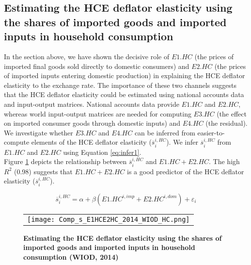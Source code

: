 \documentclass[11pt,a4paper]{paper} %
\begin{document}
\subsection{Estimating the HCE deflator elasticity using the shares of imported goods and imported inputs in household consumption}
\label{subsec:estimatingHCEwithnationalaccounts}
In the section above, we have shown the decisive role of $E1.HC$ (the prices of imported final goods sold directly to domestic consumers) and $E2.HC$ (the prices of imported inputs entering domestic production) in explaining the HCE deflator elasticity to the exchange rate.
The importance of these two channels suggests that the HCE deflator elasticity could be estimated using national accounts data and input-output matrices. 
National accounts data provide $E1.HC$ and $E2.HC$, whereas world input-output matrices are needed for computing $E3.HC$ (the effect on imported
consumer goods through domestic inputs) and $E4.HC$ (the residual). 
We investigate whether $E3.HC$ and $E4.HC$ can be inferred from easier-to-compute elements of the HCE deflator elasticity ($\overline{s}_{i}^{i,HC}$).
%
%
We infer $\overline{s}_{i}^{i,HC}$ from $E1.HC$ and $E2.HC$ using Equation \ref{eq:infer1}.\\
Figure \ref{fig:ratiodir_WIOD} depicts the relationship between $\overline{s}_{i}^{i,HC}$ and $E1.HC+E2.HC$. 
The high $R^2$ (0.98) suggests that $E1.HC+E2.HC$ is a good predictor of the HCE deflator elasticity ($\overline{s}_{i}^{i,HC}$). 

 \begin{equation}
\overline{s}_{i}^{i,HC}=\alpha + \beta  \left(E1.HC^{i,imp}+E2.HC^{i,dom}\right) +\varepsilon_i 
\label{eq:infer1}
 \end{equation}
 


\begin{figure}[H]
\centering
\caption{\footnotesize{\textbf{Estimating the HCE deflator elasticity using the shares of imported goods and imported inputs in household consumption (WIOD, 2014)}}}
\begin{tabular}{c}
\texttt{[image: Comp\_s\_E1HCE2HC\_2014\_WIOD\_HC.png]}\\
\end{tabular}
\label{fig:ratiodir_WIOD}
\end{figure}
\end{document}
